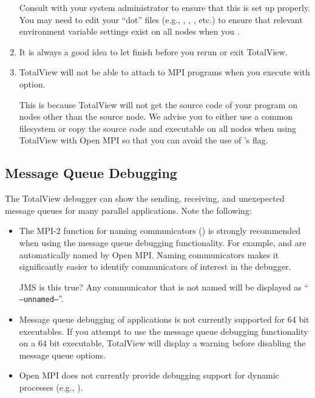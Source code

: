 \begin{enumerate}
  Consult with your system administrator to ensure that this is set up
  properly.  You may need to edit your ``dot'' files (e.g.,
  , , , etc.) to ensure that
  relevant environment variable settings exist on all nodes when you
  .
  
\item It is always a good idea to let  finish before you
  rerun or exit TotalView.
  
\item TotalView will not be able to attach to MPI programs when you
  execute  with  option.  
  
  This is because TotalView will not get the source code of your
  program on nodes other than the source node.  We advise you to
  either use a common filesystem or copy the source code and
  executable on all nodes when using TotalView with Open MPI so that you
  can avoid the use of 's  flag.
\end{enumerate}


\subsection{Message Queue Debugging}

The TotalView debugger can show the sending, receiving, and
unexepected message queues for many parallel applications.  Note the
following:

\begin{itemize}
\item The MPI-2 function for naming communicators
  () is strongly recommended when
  using the message queue debugging functionality.  For example,
   and 
  are automatically named by Open MPI.  Naming communicators makes it
  significantly easier to identify communicators of interest in the
  debugger.

  {\Huge JMS is this true?}
  Any communicator that is not named will be displayed as ``{\tt
  --unnamed--}''.

\item Message queue debugging of applications is not currently
  supported for 64 bit executables.  If you attempt to use the message
  queue debugging functionality on a 64 bit executable, TotalView will
  display a warning before disabling the message queue options.
  
\item Open MPI does not currently provide debugging support for
  dynamic processes (e.g., ).
\end{itemize}

